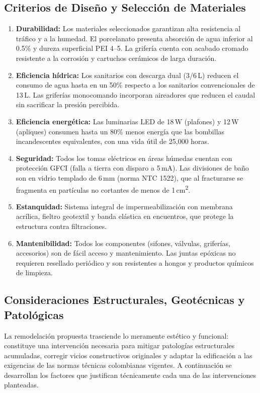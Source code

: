 ﻿\documentclass[12pt]{article}
\begin{document}
\subsection{Criterios de Diseño y Selección de Materiales}

\begin{enumerate}[noitemsep]
  \item {\bfseries Durabilidad:} Los materiales seleccionados garantizan alta resistencia al tráfico
  y a la humedad. El porcelanato presenta absorción de agua inferior al 0.5\% y dureza superficial
  PEI 4--5. La grifería cuenta con acabado cromado resistente a la corrosión y cartuchos
  cerámicos de larga duración.
  \item {\bfseries Eficiencia hídrica:} Los sanitarios con descarga dual (3/6\,L) reducen el consumo
  de agua hasta en un 50\% respecto a los sanitarios convencionales de 13\,L. Las griferías
  monocomando incorporan aireadores que reducen el caudal sin sacrificar la presión percibida.
  \item {\bfseries Eficiencia energética:} Las luminarias LED de 18\,W (plafones) y 12\,W (apliques)
  consumen hasta un 80\% menos energía que las bombillas incandescentes equivalentes, con una vida
  útil de 25,000 horas.
  \item {\bfseries Seguridad:} Todos los tomas eléctricos en áreas húmedas cuentan con
  protección GFCI (falla a tierra con disparo a 5\,mA). Las divisiones de baño son en vidrio
  templado de 6\,mm (norma NTC 1522), que al fracturarse se fragmenta en partículas no cortantes
  de menos de 1\,cm\textsuperscript{2}.
  \item {\bfseries Estanquidad:} Sistema integral de impermeabilización con membrana acrílica,
  fieltro geotextil y banda elástica en encuentros, que protege la
  estructura contra filtraciones.
  \item {\bfseries Mantenibilidad:} Todos los componentes (sifones, válvulas, griferías,
  accesorios) son de fácil acceso y mantenimiento. Las juntas epóxicas no requieren resellado
  periódico y son resistentes a hongos y productos químicos de limpieza.
\end{enumerate}

\subsection{Consideraciones Estructurales, Geotécnicas y Patológicas}

La remodelación propuesta trasciende lo meramente estético y funcional: constituye una
intervención necesaria para mitigar patologías estructurales acumuladas, corregir vicios
constructivos originales y adaptar la edificación a las exigencias de las normas técnicas
colombianas vigentes. A continuación se desarrollan los factores que justifican
técnicamente cada una de las intervenciones planteadas.
\end{document}
